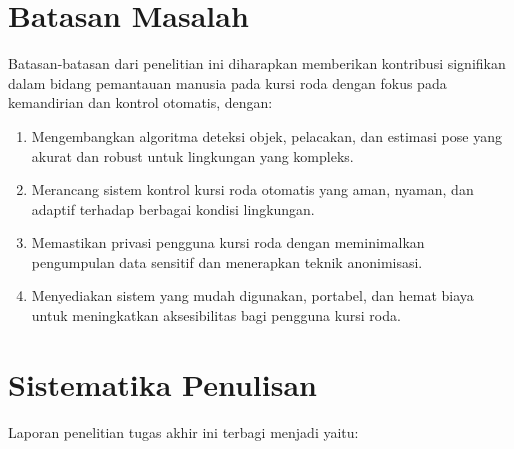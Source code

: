 \section{Batasan Masalah}
\label{sec:batasanmasalah}

Batasan-batasan dari penelitian ini diharapkan memberikan kontribusi signifikan dalam bidang pemantauan manusia pada kursi roda dengan fokus pada kemandirian dan kontrol otomatis, dengan:

\begin{enumerate}[nolistsep]

      \item Mengembangkan algoritma deteksi objek, pelacakan, dan estimasi pose yang akurat dan robust untuk lingkungan yang kompleks.

      \item Merancang sistem kontrol kursi roda otomatis yang aman, nyaman, dan adaptif terhadap berbagai kondisi lingkungan.

      \item Memastikan privasi pengguna kursi roda dengan meminimalkan pengumpulan data sensitif dan menerapkan teknik anonimisasi.

      \item Menyediakan sistem yang mudah digunakan, portabel, dan hemat biaya untuk meningkatkan aksesibilitas bagi pengguna kursi roda.

\end{enumerate}

\section{Sistematika Penulisan}
\label{sec:sistematikapenulisan}

Laporan penelitian tugas akhir ini terbagi menjadi \lipsum[1][1-3] yaitu:

